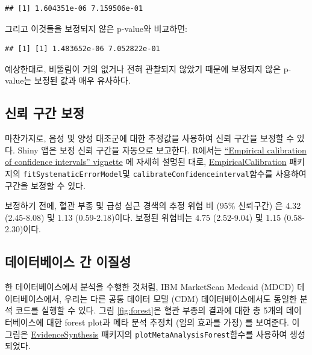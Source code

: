 \documentclass[11pt]{book}
\newenvironment{Shaded}{\begin{snugshade}}{\end{snugshade}}
\newcommand{\OperatorTok}[1]{\textcolor[rgb]{0.81,0.36,0.00}{\textbf{#1}}}
\newcommand{\NormalTok}[1]{#1}
\theoremstyle{definition}
\theoremstyle{definition}
\theoremstyle{definition}
\theoremstyle{remark}
\begin{document}
\begin{verbatim}
## [1] 1.604351e-06 7.159506e-01
\end{verbatim}

그리고 이것들을 보정되지 않은 p-value와 비교하면:

\begin{Shaded}
\end{Shaded}

\begin{verbatim}
## [1] [1] 1.483652e-06 7.052822e-01
\end{verbatim}

예상한대로, 비뚤림이 거의 없거나 전혀 관찰되지 않았기 때문에 보정되지
않은 p-value는 보정된 값과 매우 유사하다.

\subsection{신뢰 구간 보정}\label{---1}

마찬가지로, 음성 및 양성 대조군에 대한 추정값을 사용하여 신뢰 구간을
보정할 수 있다. Shiny 앱은 보정 신뢰 구간을 자동으로 보고한다. R에서는
\href{https://ohdsi.github.io/EmpiricalCalibration/articles/EmpiricalCiCalibrationVignette.html}{``Empirical
calibration of confidence intervals'' vignette} 에 자세히 설명된 대로,
\href{https://ohdsi.github.io/EmpiricalCalibration/}{EmpiricalCalibration}
패키지의 \texttt{fitSystematicErrorModel}및
\texttt{calibrateConfidenceinterval}함수를 사용하여 구간을 보정할 수
있다.

보정하기 전에, 혈관 부종 및 급성 심근 경색의 추정 위험 비 (95\%
신뢰구간) 은 4.32 (2.45-8.08) 및 1.13 (0.59-2.18)이다. 보정된 위험비는
4.75 (2.52-9.04) 및 1.15 (0.58-2.30)이다.

\subsection{데이터베이스 간 이질성}\label{--}

한 데이터베이스에서 분석을 수행한 것처럼, IBM MarketScan Medcaid (MDCD)
데이터베이스에서, 우리는 다른 공통 데이터 모델 (CDM) 데이터베이스에서도
동일한 분석 코드를 실행할 수 있다. 그림 \ref{fig:forest}은 혈관 부종의
결과에 대한 총 5개의 데이터베이스에 대한 forest plot과 메타 분석 추정치
(임의 효과를 가정) \citep{dersimonian_1986} 를 보여준다. 이 그림은
\href{https://ohdsi.github.io/EvidenceSynthesis/}{EvidenceSynthesis}
패키지의 \texttt{plotMetaAnalysisForest}함수를 사용하여 생성되었다.
\end{document}
